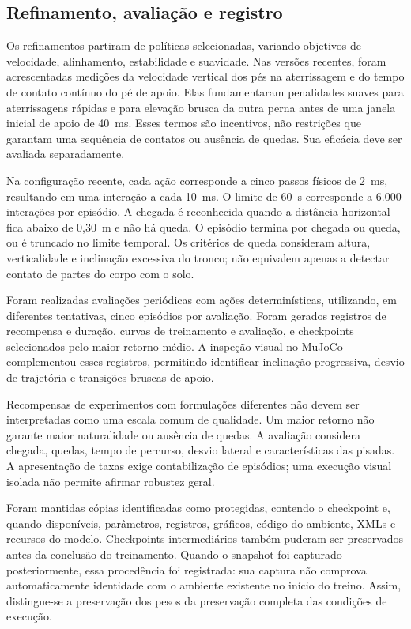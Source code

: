 \subsection{Refinamento, avaliação e registro}

Os refinamentos partiram de políticas selecionadas, variando objetivos de velocidade, alinhamento, estabilidade e suavidade. Nas versões recentes, foram acrescentadas medições da velocidade vertical dos pés na aterrissagem e do tempo de contato contínuo do pé de apoio. Elas fundamentaram penalidades suaves para aterrissagens rápidas e para elevação brusca da outra perna antes de uma janela inicial de apoio de 40~ms. Esses termos são incentivos, não restrições que garantam uma sequência de contatos ou ausência de quedas. Sua eficácia deve ser avaliada separadamente.

Na configuração recente, cada ação corresponde a cinco passos físicos de 2~ms, resultando em uma interação a cada 10~ms. O limite de 60~s corresponde a 6.000 interações por episódio. A chegada é reconhecida quando a distância horizontal fica abaixo de 0,30~m e não há queda. O episódio termina por chegada ou queda, ou é truncado no limite temporal. Os critérios de queda consideram altura, verticalidade e inclinação excessiva do tronco; não equivalem apenas a detectar contato de partes do corpo com o solo.

Foram realizadas avaliações periódicas com ações determinísticas, utilizando, em diferentes tentativas, cinco episódios por avaliação. Foram gerados registros de recompensa e duração, curvas de treinamento e avaliação, e checkpoints selecionados pelo maior retorno médio. A inspeção visual no MuJoCo complementou esses registros, permitindo identificar inclinação progressiva, desvio de trajetória e transições bruscas de apoio.

Recompensas de experimentos com formulações diferentes não devem ser interpretadas como uma escala comum de qualidade. Um maior retorno não garante maior naturalidade ou ausência de quedas. A avaliação considera chegada, quedas, tempo de percurso, desvio lateral e características das pisadas. A apresentação de taxas exige contabilização de episódios; uma execução visual isolada não permite afirmar robustez geral.

Foram mantidas cópias identificadas como protegidas, contendo o checkpoint e, quando disponíveis, parâmetros, registros, gráficos, código do ambiente, XMLs e recursos do modelo. Checkpoints intermediários também puderam ser preservados antes da conclusão do treinamento. Quando o snapshot foi capturado posteriormente, essa procedência foi registrada: sua captura não comprova automaticamente identidade com o ambiente existente no início do treino. Assim, distingue-se a preservação dos pesos da preservação completa das condições de execução.
